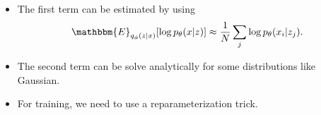 \begin{itemize}
	\item The first term can be estimated by using
		$$\mathbbm{E}_{q_{\phi}(z|x)}[\log p_{\theta}(x|z)]\approx \frac{1}{N}\sum_j \log p_{\theta}(x_i|z_j).$$
	\item The second term can be solve analytically for some distributions like Gaussian.
	\item For training, we need to use a reparameterization trick. 
\end{itemize}




